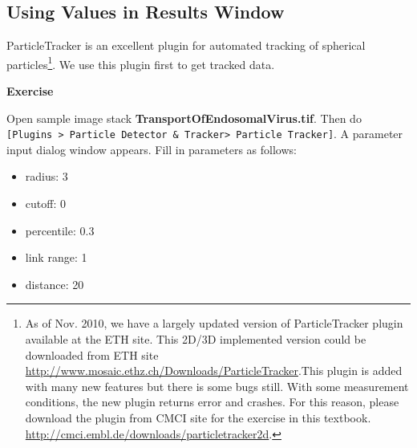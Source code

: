 \documentclass[11pt,a4paper,oneside]{report}
\newenvironment{indentexercise}[1]%
{{\setlength{\leftmargin}{2em}}%
\textbf{Exercise \thesubsection-#1}%
\begin{list}{}%
	\item%
}
{\end{list}}
\newcommand{\ijmenu}[1]{\texttt{\small#1}}
\begin{document}
\subsection{Using Values in Results Window}

ParticleTracker is an excellent plugin for automated tracking of spherical particles\footnote{ As of Nov. 2010, we have a largely updated version of ParticleTracker plugin available at the ETH site. This 2D/3D implemented version could be downloaded from ETH site \url{
http://www.mosaic.ethz.ch/Downloads/ParticleTracker}.This plugin is added with many new features but there is some bugs still. With some measurement conditions, the new plugin returns error and crashes. For this reason, please download the plugin from CMCI site for the exercise in this textbook. \url{http://cmci.embl.de/downloads/particletracker2d}.  }. We use this plugin first to get tracked data. 

\begin{indentexercise}{1}
\item Open sample image stack \textbf{TransportOfEndosomalVirus.tif}. Then do \ijmenu{[Plugins > Particle Detector \& Tracker> Particle Tracker]}. A parameter input dialog window appears. Fill in  parameters as follows:
\begin{itemize}
\item radius: 3
\item cutoff: 0
\item percentile: 0.3
\item link range: 1
\item distance: 20
\end{itemize}
\end{indentexercise}
\end{document}
